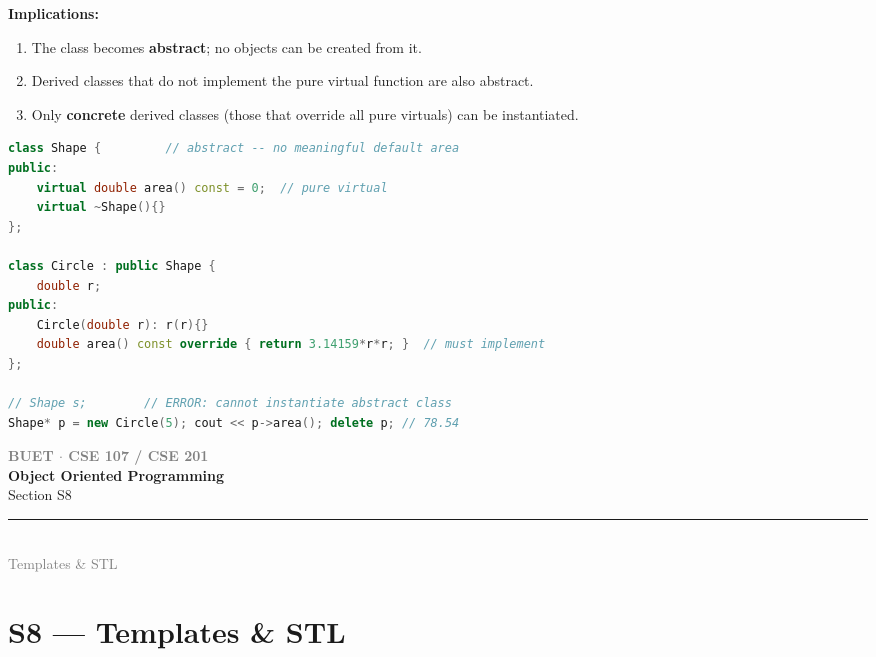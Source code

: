 \documentclass[12pt,a3paper]{article}
\newcommand{\secdivider}[4]{%
  \newpage\thispagestyle{empty}%
  \vspace*{\fill}%
  \begin{tcolorbox}[enhanced,colback=#4!7,colframe=#3,boxrule=1.5pt,arc=8pt,
    left=20pt,right=20pt,top=22pt,bottom=22pt,
    shadow={3pt}{-3pt}{0pt}{black!15}]
    \centering
    {\large\textcolor{gray}{\textbf{BUET $\cdot$ CSE 107 / CSE 201}}}\\[8pt]
    {\fontsize{26}{32}\selectfont\bfseries\textcolor{#3}{Object Oriented Programming}}\\[6pt]
    {\fontsize{15}{19}\selectfont\textcolor{dgray}{#1}}\\[12pt]
    \textcolor{#3!60}{\rule{0.5\textwidth}{0.5pt}}\\[6pt]
    {\small\textcolor{gray}{#2}}
  \end{tcolorbox}%
  \vspace*{\fill}\newpage%
}
\begin{document}
\begin{enumerate}
\begin{tcolorbox}
\textbf{Implications:}
\begin{enumerate}[label=\textbf{\arabic*.}]
  \item The class becomes \textbf{abstract}; no objects can be
    created from it.
  \item Derived classes that do not implement the pure virtual
    function are also abstract.
  \item Only \textbf{concrete} derived classes (those that override
    all pure virtuals) can be instantiated.
\end{enumerate}

\begin{lstlisting}[language=C++]
class Shape {         // abstract -- no meaningful default area
public:
    virtual double area() const = 0;  // pure virtual
    virtual ~Shape(){}
};

class Circle : public Shape {
    double r;
public:
    Circle(double r): r(r){}
    double area() const override { return 3.14159*r*r; }  // must implement
};

// Shape s;        // ERROR: cannot instantiate abstract class
Shape* p = new Circle(5); cout << p->area(); delete p; // 78.54
\end{lstlisting}

\end{tcolorbox}





\end{enumerate}
\newpage

\secdivider{Section S8}{Templates \& STL}{cH}{cH}
\label{sec:S8}
\titleformat{\section}{\large\bfseries\color{cH}}{}{0em}{}[\titlerule]
\section{S8 --- Templates \& STL}
\end{document}
